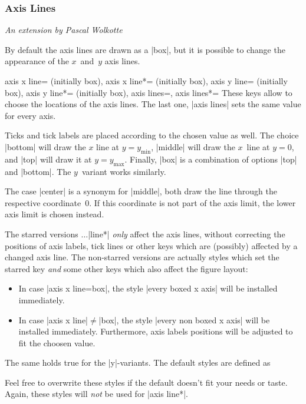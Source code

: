 \subsubsection{Axis Lines}

{\small \emph{An extension by Pascal Wolkotte}}
\vspace{0.4cm}%

\label{sec:pgfplots:axislines}
\noindent By default the axis lines are drawn as a |box|, but it is possible to change the appearance of the $x$~and~$y$ axis lines.

\begin{pgfplotskeylist}{
	axis x line= (initially box),
	axis x line*= (initially box),
	axis y line= (initially box),
	axis y line*= (initially box),
	axis lines=,
	axis lines*=}
	These keys allow to choose the locations of the axis lines. The last one, |axis lines| sets the same value for every axis.

Ticks and tick labels are placed according to the chosen value as well.
The choice |bottom| will draw the $x$ line at $y=y_{\text{min}}$, |middle| will draw the $x$~line at $y=0$, and |top| will draw it at $y=y_{\text{max}}$. Finally, |box| is a combination of options |top| and |bottom|. The $y$~variant works similarly.

The case |center| is a synonym for |middle|, both draw the line through the respective coordinate~$0$. If this coordinate is not part of the axis limit, the lower axis limit is chosen instead.


The starred versions $\dotsc$|line*| \emph{only} affect the axis lines, without correcting the positions of axis labels, tick lines or other keys which are (possibly) affected by a changed axis line. The non-starred versions are actually styles which set the starred key \emph{and} some other keys which also affect the figure layout:
\begin{itemize}
	\item In case |axis x line=box|, the style |every boxed x axis| will be installed immediately.
	\item In case |axis x line|$\neq$|box|, the style |every non boxed x axis| will be installed immediately. Furthermore, axis labels positions will be adjusted to fit the choosen value.
\end{itemize}
The same holds true for the |y|-variants. The default styles are defined as
\begin{codeexample}
\end{codeexample}
Feel free to overwrite these styles if the default doesn't fit your needs or taste. Again, these styles will \emph{not} be used for |axis line*|. 


\end{pgfplotskeylist}
